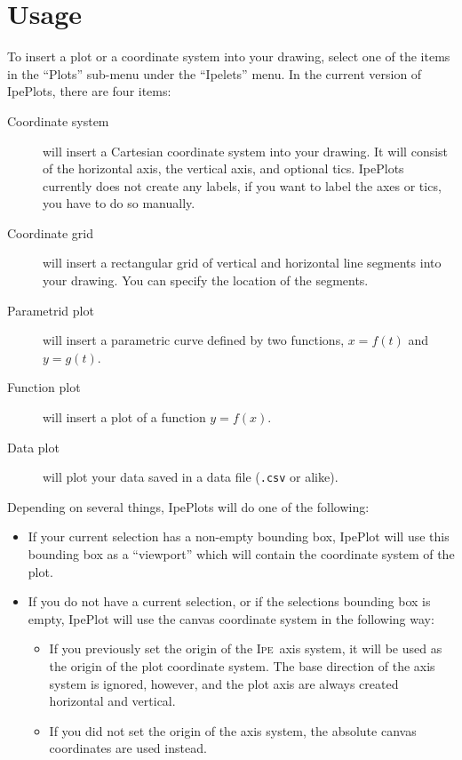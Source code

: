 \documentclass{article}
\def\Ipe{\textsc{Ipe}}
\begin{document}
\section{Usage}
To insert a plot or a coordinate system into your drawing, select one of the
items in the ``Plots'' sub-menu under the ``Ipelets'' menu.  In the current
version of IpePlots, there are four items:
\begin{description}
   \item[Coordinate system] will insert a Cartesian coordinate system into your
      drawing.  It will consist of the horizontal axis, the vertical axis, and
      optional tics.  IpePlots currently does not create any labels, if you
      want to label the axes or tics, you have to do so manually.
   \item[Coordinate grid] will insert a rectangular grid of vertical and
      horizontal line segments into your drawing.  You can specify the location
      of the segments. 
   \item[Parametrid plot] will insert a parametric curve defined by two
      functions, $x = f(t)$ and $y = g(t)$.
   \item[Function plot] will insert a plot of a function $y = f(x)$. 
   \item[Data plot] will plot your data saved in a data file (\texttt{.csv} or alike).
\end{description}
Depending on several things, IpePlots will do one of the following:
\begin{itemize}
   \item If your current selection has a non-empty bounding box, IpePlot will
      use this bounding box as a ``viewport'' which will contain the coordinate
      system of the plot.
   \item If you do not have a current selection, or if the selections bounding
      box is empty, IpePlot will use the canvas coordinate system in the
      following way:
      \begin{itemize}
	 \item If you previously set the origin of the \Ipe\ axis system, it
	    will be used as the origin of the plot coordinate system.  The
	    base direction of the axis system is ignored, however, and the plot
	    axis are always created horizontal and vertical. 
	 \item If you did not set the origin of the axis system, the absolute
	    canvas coordinates are used instead. 
      \end{itemize}
\end{itemize}
\end{document}
